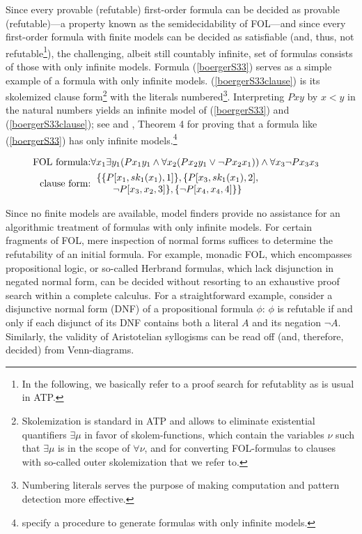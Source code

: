 \documentclass[%
  manuscript=article,   %
  year=2024,
  volume=77,
  doi=00000.000,
]{zfn}
\begin{document}
Since every provable (refutable) first-order formula can be decided as provable (refutable)---a property known as the semidecidability of FOL---and since every first-order formula with finite models can be decided as satisfiable (and, thus, not refutable\footnote{In the following, we basically refer to a proof search for refutablity as is usual in ATP.}), the challenging, albeit still countably infinite, set of formulas consists of those with only infinite models. Formula (\ref{boergerS33}) serves as a simple example of a formula with only infinite models. (\ref{boergerS33clause}) is its skolemized clause form\footnote{Skolemization is standard in ATP and allows to eliminate existential quantifiers $\exists \mu$ in favor of skolem-functions, which contain the variables $\nu$ such that $\exists \mu$ is in the scope of $\forall \nu$, \parencite[cf.][chapter 5.5]{Baaz_et_al} and \parencite[][chapter 6.3 and 6.5]{NonnengartWeidenbach} for converting FOL-formulas to clauses with so-called outer skolemization that we refer to.} with the literals numbered\footnote{Numbering literals serves the purpose of making computation and pattern detection more effective.}. Interpreting $Pxy$ by $x<y$ in the natural numbers yields an infinite model of (\ref{boergerS33}) and (\ref{boergerS33clause}); see \parencite[][p. 33]{Boerger_et_al} and \parencite{LampertNakano}, Theorem 4 for proving that a formula like (\ref{boergerS33}) has only infinite models.\footnote{\parencite{LampertNakano} specify a procedure to generate formulas with only infinite models.}

\renewcommand{\arraystretch}{1.25}
\begin{eqnarray}
\mbox{FOL formula:} & \forall x_{1}\exists y_{1} (Px_{1}y_{1} \wedge \forall x_{2}(Px_{2}y_{1} \vee \neg Px_{2}x_{1})) \wedge   \forall x_{3} \neg Px_{3}x_{3} &  \label{boergerS33}\\
\mbox{clause form:} & \begin{tabular}{c}$\{\{P[x_{1}, sk_1(x_{1}), 1]\}, \{P[x_{3}, sk_1(x_{1}), 2],$\\
 $\neg P[x_{3}, x_{2}, 3]\}, \{\neg P[x_{4},x_{4}, 4]\}\}$\end{tabular} &  \label{boergerS33clause}
\end{eqnarray}

Since no finite models are available, model finders provide no assistance for an algorithmic treatment of formulas with only infinite models. For certain fragments of FOL, mere inspection of normal \label{normalforms} forms suffices to determine the refutability of an initial formula. For example, monadic FOL, which encompasses propositional logic, or so-called Herbrand formulas, which lack disjunction in negated normal form, can be decided without resorting to an exhaustive proof search within a complete calculus. For a straightforward example, consider a disjunctive normal form (DNF) of a propositional formula $\phi$: $\phi$ is refutable if and only if each disjunct of its DNF contains both a literal $A$ and its negation $\neg A$. Similarly, the validity of Aristotelian syllogisms can be read off (and, therefore, decided) from Venn-diagrams.
\end{document}

